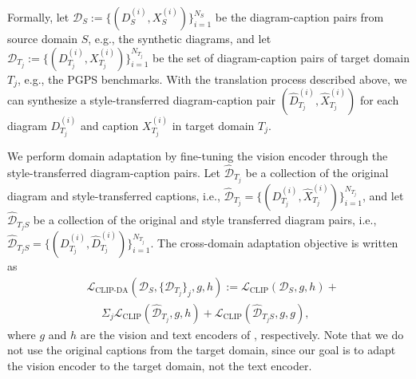 
Formally, let $\mathcal{D}_{S} := \{(D_S^{(i)}, X_S^{(i)}) \}_{i=1}^{N_S}$ be the diagram-caption pairs from source domain $S$, e.g., the synthetic diagrams, and let $\mathcal{D}_{T_j} := \{(D_{T_j}^{(i)}, X_{T_j}^{(i)}) \}_{i=1}^{N_{T_j}}$ be the set of diagram-caption pairs of target domain $T_j$, e.g., the PGPS benchmarks. With the translation process described above, we can synthesize a style-transferred diagram-caption pair $(\hat{D}_{T_j}^{(i)}, \hat{X}_{T_j}^{(i)})$ for each diagram $D_{T_j}^{(i)}$ and caption $X_{T_j}^{(i)}$ in target domain $T_j$.

We perform domain adaptation by fine-tuning the vision encoder through the style-transferred diagram-caption pairs.
Let $\hat{\mathcal{D}}_{T_j}$ be a collection of the original diagram and style-transferred captions, i.e., $\hat{\mathcal{D}}_{T_j} = \{(D_{T_j}^{(i)}, \hat{X}_{T_j}^{(i)})\}_{i=1}^{N_{T_j}}$, and let $\hat{\mathcal{D}}_{T_jS}$ be a collection of the original and style transferred diagram pairs, i.e., $\hat{\mathcal{D}}_{T_jS}= \{(D_{T_j}^{(i)}, \hat{D}_{T_j}^{(i)}) \}_{i=1}^{N_{T_j}}$. The cross-domain adaptation objective is written as
\begin{align}
    &\mathcal{L}_{\textrm{CLIP-DA}}(\mathcal{D}_S, \{\mathcal{D}_{T_j}\}_j, g, h) := 
    \mathcal{L}_{\textrm{CLIP}}(\mathcal{D}_S, g, h) + \nonumber\\
    &\,\,\,\,\,\,\,\,\Sigma_j \mathcal{L}_{\textrm{CLIP}}(\hat{\mathcal{D}}_{T_j}, g, h) + \mathcal{L}_{\textrm{CLIP}}(\hat{\mathcal{D}}_{T_jS}, g, g),
    \label{eqn:da}
\end{align}
where $g$ and $h$ are the vision and text encoders of \geoclip{}, respectively. Note that we do not use the original captions from the target domain, since our goal is to adapt the vision encoder to the target domain, not the text encoder.

